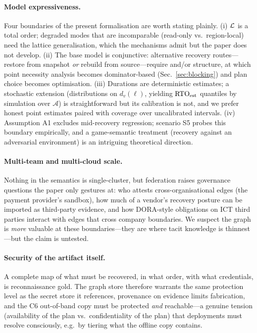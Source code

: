 \paragraph{Model expressiveness.}
Four boundaries of the present formalisation are worth stating plainly. (i) $\mathcal{L}$ is a total order; degraded modes that are incomparable (read-only vs.\ region-local) need the lattice generalisation, which the mechanisms admit but the paper does not develop. (ii) The base model is conjunctive: alternative recovery routes---restore from snapshot \emph{or} rebuild from source---require and/or structure, at which point necessity analysis becomes dominator-based (Sec.~\ref{sec:blocking}) and plan choice becomes optimisation. (iii) Durations are deterministic estimates; a stochastic extension (distributions on $d_v(\ell)$, yielding $\mathrm{RTO}_{\mathrm{est}}$ quantiles by simulation over $\mathcal{A}$) is straightforward but its calibration is not, and we prefer honest point estimates paired with coverage over uncalibrated intervals. (iv) Assumption A1 excludes mid-recovery regression; scenario S5 probes this boundary empirically, and a game-semantic treatment (recovery against an adversarial environment) is an intriguing theoretical direction.

\paragraph{Multi-team and multi-cloud scale.}
Nothing in the semantics is single-cluster, but federation raises governance questions the paper only gestures at: who attests cross-organisational edges (the payment provider's sandbox), how much of a vendor's recovery posture can be imported as third-party evidence, and how DORA-style obligations on ICT third parties \citep{eu2022dora} interact with edges that cross company boundaries. We suspect the graph is \emph{more} valuable at these boundaries---they are where tacit knowledge is thinnest---but the claim is untested.

\paragraph{Security of the artifact itself.}
A complete map of what must be recovered, in what order, with what credentials, is reconnaissance gold. The graph store therefore warrants the same protection level as the secret store it references, provenance on evidence limits fabrication, and the C6 out-of-band copy must be protected \emph{and} reachable---a genuine tension (availability of the plan vs.\ confidentiality of the plan) that deployments must resolve consciously, e.g.\ by tiering what the offline copy contains.

